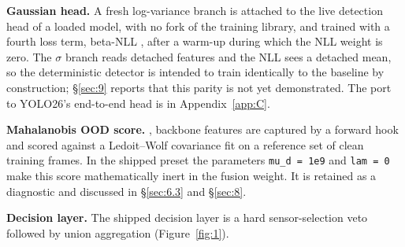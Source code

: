 \documentclass[10pt]{article}
\begin{document}
\textbf{Gaussian head.} A fresh log-variance branch is attached to the live detection head of a loaded model, with no fork of the training library, and trained with a fourth loss term, beta-NLL \citep{seitzer2022on}, after a warm-up during which the NLL weight is zero. The $\sigma$ branch reads detached features and the NLL sees a detached mean, so the deterministic detector is intended to train identically to the baseline by construction; \S\ref{sec:9} reports that this parity is not yet demonstrated. The port to YOLO26's end-to-end head is in Appendix~\ref{app:C}.

\textbf{Mahalanobis OOD score.} \citet{lee2018a}, backbone features are captured by a forward hook and scored against a Ledoit--Wolf covariance \citep{ledoit2004a} fit on a reference set of clean training frames. In the shipped preset the parameters \texttt{mu\_\allowbreak{}d = 1e9} and \texttt{lam = 0} make this score mathematically inert in the fusion weight. It is retained as a diagnostic and discussed in \S\ref{sec:6.3} and \S\ref{sec:8}.

\textbf{Decision layer.} The shipped decision layer is a hard sensor-selection veto followed by union aggregation (Figure~\ref{fig:1}).
\end{document}
